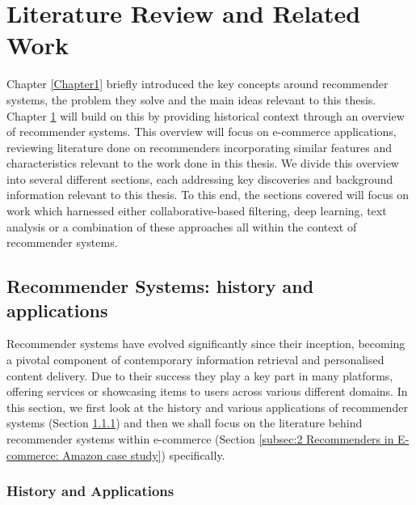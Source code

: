 
\chapter{Literature Review and Related Work} %

\label{Chapter2} %

Chapter \ref{Chapter1} briefly introduced the key concepts around recommender systems, the problem they solve and the main ideas relevant to this thesis. Chapter \ref{Chapter2} will build on this by providing historical context through an overview of recommender systems. This overview will focus on e-commerce applications, reviewing literature done on recommenders incorporating similar features and characteristics relevant to the work done in this thesis. We divide this overview into several different sections, each addressing key discoveries and background information relevant to this thesis. To this end, the sections covered will focus on work which harnessed either collaborative-based filtering, deep learning, text analysis or a combination of these approaches all within the context of recommender systems.

\section{Recommender Systems: history and applications}
\label{sec:2 Recommender Systems: history and applications}

Recommender systems have evolved significantly since their inception, becoming a pivotal component of contemporary information retrieval and personalised content delivery. Due to their success they play a key part in many platforms, offering services or showcasing items to users across various different domains. In this section, we first look at the history and various applications of recommender systems (Section \ref{subsec:2 History and Applications}) and then we shall focus on the literature behind recommender systems within e-commerce (Section \ref{subsec:2 Recommenders in E-commerce: Amazon case study}) specifically. 


\subsection{History and Applications}
\label{subsec:2 History and Applications}

